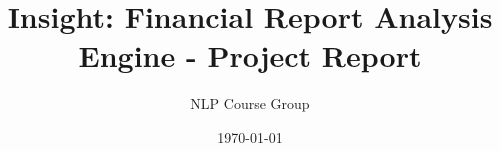 \documentclass[12pt, a4paper]{article}
\begin{document}
\title{Insight: Financial Report Analysis Engine - Project Report}
\author{NLP Course Group}
\date{\today}

\maketitle

\tableofcontents
\newpage







\end{document}

